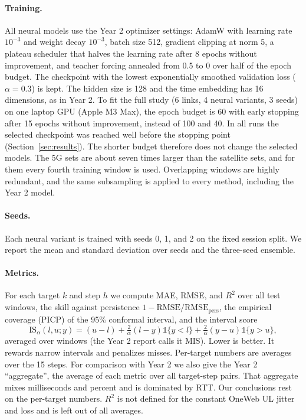 \paragraph{Training.} All neural models use the Year 2 optimizer settings: AdamW with learning rate $10^{-3}$ and weight decay $10^{-3}$, batch size 512, gradient clipping at norm 5, a plateau scheduler that halves the learning rate after 8 epochs without improvement, and teacher forcing annealed from 0.5 to 0 over half of the epoch budget. The checkpoint with the lowest exponentially smoothed validation loss ($\alpha=0.3$) is kept. The hidden size is 128 and the time embedding has 16 dimensions, as in Year 2. To fit the full study (6 links, 4 neural variants, 3 seeds) on one laptop GPU (Apple M3 Max), the epoch budget is 60 with early stopping after 15 epochs without improvement, instead of 100 and 40. In all runs the selected checkpoint was reached well before the stopping point (Section~\ref{sec:results}). The shorter budget therefore does not change the selected models. The 5G sets are about seven times larger than the satellite sets, and for them every fourth training window is used. Overlapping windows are highly redundant, and the same subsampling is applied to every method, including the Year 2 model.

\paragraph{Seeds.} Each neural variant is trained with seeds 0, 1, and 2 on the fixed session split. We report the mean and standard deviation over seeds and the three-seed ensemble.

\paragraph{Metrics.} For each target $k$ and step $h$ we compute MAE, RMSE, and $R^2$ over all test windows, the skill against persistence $1-\mathrm{RMSE}/\mathrm{RMSE}_{\text{pers}}$, the empirical coverage (PICP) of the 95\% conformal interval, and the interval score~\cite{gneiting2007strictly}
\begin{equation}
\mathrm{IS}_\alpha(l,u;y)=(u-l)+\tfrac{2}{\alpha}(l-y)\mathbb{1}\{y<l\}+\tfrac{2}{\alpha}(y-u)\mathbb{1}\{y>u\},
\end{equation}
averaged over windows (the Year 2 report calls it MIS). Lower is better. It rewards narrow intervals and penalizes misses. Per-target numbers are averages over the 15 steps. For comparison with Year 2 we also give the Year 2 ``aggregate'', the average of each metric over all target-step pairs. That aggregate mixes milliseconds and percent and is dominated by RTT. Our conclusions rest on the per-target numbers. $R^2$ is not defined for the constant OneWeb UL jitter and loss and is left out of all averages.
